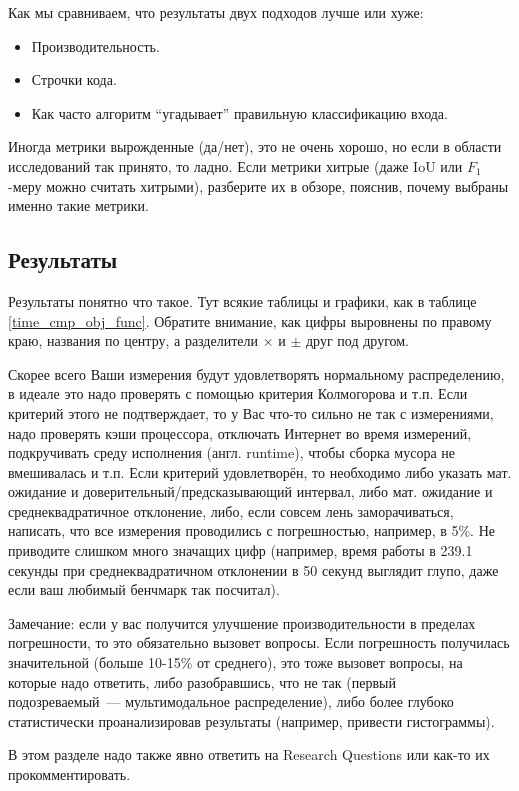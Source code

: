 Как мы сравниваем, что результаты двух подходов лучше или хуже:
\begin{itemize}
    \item Производительность.
    \item Строчки кода.
    \item Как часто алгоритм \enquote{угадывает} правильную класси\-фикацию входа.
\end{itemize}

\noindent Иногда метрики вырожденные (да/нет), это не очень хорошо, но если в области исследований так принято, то ладно. Если метрики хитрые (даже IoU или $F_1$-меру можно считать хитрыми), разберите их в обзоре, пояснив, почему выбраны именно такие метрики.

\subsection{Результаты}
Результаты понятно что такое. Тут всякие таблицы и графики, как в таблице \ref{time_cmp_obj_func}. Обратите внимание, как цифры выровнены по правому краю, названия по центру, а разделители $\times$ и $\pm$ друг под другом.

Скорее всего Ваши измерения будут удовлетворять нормальному распределению, в идеале это надо проверять с помощью критерия Кол\-могорова и т.п.
Если критерий этого не подтверждает, то у Вас что-то сильно не так с измерениями, надо проверять кэши процессора, отключать Интернет во время измерений, подкручивать среду исполне\-ния (англ. runtime), что\-бы сборка мусора не вмешивалась и т.п.
Если критерий удовлетворён, то необходимо либо указать мат. ожидание и доверительный/предсказы\-вающий интервал, либо мат. ожидание и среднеквадратичное отклонение, либо, если совсем лень заморачиваться, написать, что все измерения проводились с погрешностью, например, в 5\%. Не приводите слишком много значащих цифр (например, время работы в 239.1 секунды при среднеквадратичном отклонении в 50 секунд выглядит глупо, даже если ваш любимый бенчмарк так посчитал).

Замечание: если у вас получится улуч\-шение производительности в пределах погреш\-ности, то это обязательно вызовет вопросы. Если погрешность получилась значительной (больше 10-15\% от среднего), это тоже вызовет вопросы, на которые надо ответить, либо разобравшись, что не так (первый подозреваемый~--- мультимодальное распределение), либо более глубоко статистически проанализировав результаты (например, привести гистограммы).

В этом разделе надо также явно ответить на Research Questions или как-то их прокомментировать.

